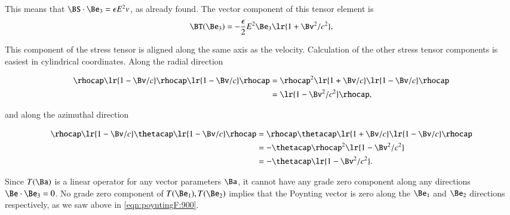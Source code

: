 This means that \( \BS \cdot \Be_3 = \epsilon E^2 v \), as already found.  The vector component of this tensor element is
\begin{dmath}\label{eqn:poyntingStaticExamples:1000}
\BT(\Be_3) =
- \frac{\epsilon}{2} E^2 \Be_3 \lr{1 + \Bv^2/c^2 },
\end{dmath}

This component of the stress tensor is aligned along the same axis as the velocity.
Calculation of the other stress tensor components is easiest in cylindrical coordinates.  Along the radial direction

\begin{dmath}\label{eqn:poyntingStaticExamples:1020}
\begin{aligned}
\rhocap \lr{ 1 - \Bv/c } \rhocap \lr{1 - \Bv/c} \rhocap
&=
\rhocap^2 \lr{ 1 + \Bv/c} \lr{1 - \Bv/c} \rhocap \\
&= \lr{1 - \Bv^2/c^2} \rhocap,
\end{aligned}
\end{dmath}

and along the azimuthal direction

\begin{dmath}\label{eqn:poyntingStaticExamples:1100}
\begin{aligned}
\rhocap \lr{ 1 - \Bv/c } \thetacap \lr{1 - \Bv/c} \rhocap
&=
\rhocap \thetacap \lr{1 + \Bv/c} \lr{1 - \Bv/c} \rhocap \\
&=
-\thetacap \rhocap^2 \lr{1 - \Bv^2/c^2} \\
&=
-\thetacap \lr{1 - \Bv^2/c^2}.
\end{aligned}
\end{dmath}

Since \( T(\Ba) \) is a linear operator for any vector parameters \( \Ba \), it cannot have any grade zero component along any directions \( \Be \cdot \Be_3 = 0 \).
No grade zero component of \( T(\Be_1), T(\Be_2) \) implies that the Poynting vector is zero along the \( \Be_1 \) and \( \Be_2 \) directions respectively, as we saw above in
\cref{eqn:poyntingF:900}.

%
%
%


